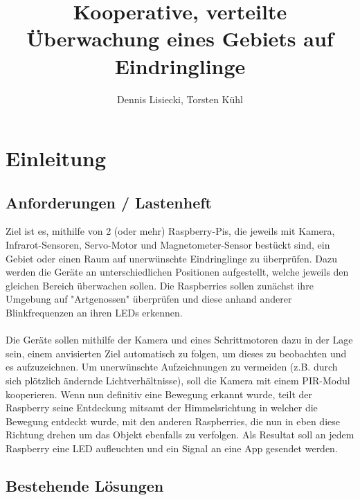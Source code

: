 \documentclass[12pt,a4paper]{scrreprt}
\title{Kooperative, verteilte Überwachung eines Gebiets auf Eindringlinge}
\author{Dennis Lisiecki, Torsten Kühl}
\begin{document}
\maketitle	%
\tableofcontents	%

\chapter{Einleitung}
\section{Anforderungen / Lastenheft}
Ziel ist es, mithilfe von 2 (oder mehr) Raspberry-Pis, die jeweils mit Kamera, Infrarot-Sensoren, Servo-Motor und Magnetometer-Sensor bestückt sind, ein Gebiet oder einen Raum auf unerwünschte Eindringlinge zu überprüfen. 
Dazu werden die Geräte an unterschiedlichen Positionen aufgestellt, welche jeweils den gleichen Bereich überwachen sollen. Die Raspberries sollen zunächst ihre Umgebung auf "Artgenossen" überprüfen und diese anhand anderer Blinkfrequenzen an ihren LEDs erkennen.
\\ \\
Die Geräte sollen mithilfe der Kamera und eines Schrittmotoren dazu in der Lage sein, einem anvisierten Ziel automatisch zu folgen, um dieses zu beobachten und es aufzuzeichnen. Um unerwünschte Aufzeichnungen zu vermeiden (z.B. durch sich plötzlich ändernde Lichtverhältnisse), soll die Kamera mit einem PIR-Modul kooperieren.
Wenn nun definitiv eine Bewegung erkannt wurde, teilt der Raspberry seine Entdeckung mitsamt der Himmelsrichtung in welcher die Bewegung entdeckt wurde, mit den anderen Raspberries, die nun in eben diese Richtung drehen um das Objekt ebenfalls zu verfolgen. Als Resultat soll an jedem Raspberry eine LED aufleuchten und ein Signal an eine App gesendet werden. 


\section{Bestehende Lösungen}
\end{document}
